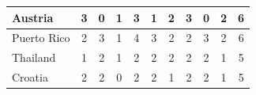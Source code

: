\documentclass[12pt]{article}  %
\begin{document}
\begin{subappendices}
\begin{longtable}{|l|c|c|c|c|c|c|c|c|c|c|}
	\hline
	Austria                                                        & 3                                                                      & 0                                                                      & 1                                                                      & 3                                                                      & 1                                                                      & 2                                                                      & 3                         & 0                           & 2                           & 6                           \\ 
	\hline
	Puerto Rico                                                    & 2                                                                      & 3                                                                      & 1                                                                      & 4                                                                      & 3                                                                      & 2                                                                      & 2                         & 3                           & 2                           & 6                           \\ 
	\hline
	Thailand                                                       & 1                                                                      & 2                                                                      & 1                                                                      & 2                                                                      & 2                                                                      & 2                                                                      & 2                         & 2                           & 1                           & 5                           \\ 
	\hline
	Croatia                                                        & 2                                                                      & 2                                                                      & 0                                                                      & 2                                                                      & 2                                                                      & 1                                                                      & 2                         & 2                           & 1                           & 5                           \\ 

\end{longtable}
\end{subappendices}
\end{document}
